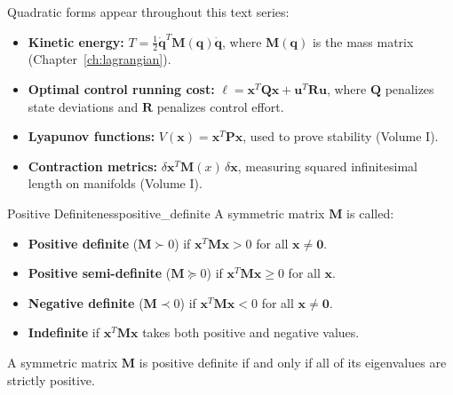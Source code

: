 Quadratic forms appear throughout this text series:
\begin{itemize}
    \item \textbf{Kinetic energy:} $T = \frac{1}{2}\dot{\mathbf{q}}^T \mathbf{M}(\mathbf{q}) \dot{\mathbf{q}}$, where $\mathbf{M}(\mathbf{q})$ is the mass matrix (Chapter~\ref{ch:lagrangian}).
    \item \textbf{Optimal control running cost:} $\ell = \mathbf{x}^T \mathbf{Q} \mathbf{x} + \mathbf{u}^T \mathbf{R} \mathbf{u}$, where $\mathbf{Q}$ penalizes state deviations and $\mathbf{R}$ penalizes control effort.
    \item \textbf{Lyapunov functions:} $V(\mathbf{x}) = \mathbf{x}^T \mathbf{P} \mathbf{x}$, used to prove stability (Volume I).
    \item \textbf{Contraction metrics:} $\delta\mathbf{x}^T \mathbf{M}(x) \, \delta\mathbf{x}$, measuring squared infinitesimal length on manifolds (Volume I).
\end{itemize}

\begin{definition}{Positive Definiteness}{positive_definite}
A symmetric matrix $\mathbf{M}$ is called:
\begin{itemize}
    \item \textbf{Positive definite} ($\mathbf{M} \succ 0$) if $\mathbf{x}^T \mathbf{M} \mathbf{x} > 0$ for all $\mathbf{x} \neq \mathbf{0}$.
    \item \textbf{Positive semi-definite} ($\mathbf{M} \succeq 0$) if $\mathbf{x}^T \mathbf{M} \mathbf{x} \geq 0$ for all $\mathbf{x}$.
    \item \textbf{Negative definite} ($\mathbf{M} \prec 0$) if $\mathbf{x}^T \mathbf{M} \mathbf{x} < 0$ for all $\mathbf{x} \neq \mathbf{0}$.
    \item \textbf{Indefinite} if $\mathbf{x}^T \mathbf{M} \mathbf{x}$ takes both positive and negative values.
\end{itemize}
\end{definition}

\begin{proposition}
\label{prop:pd_eigenvalues}
A symmetric matrix $\mathbf{M}$ is positive definite if and only if all of its eigenvalues are strictly positive.
\end{proposition}

